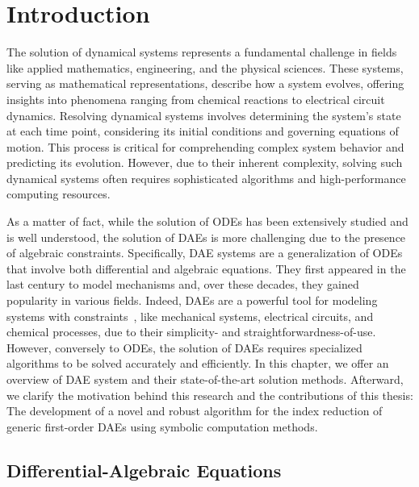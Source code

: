 
\chapter{Introduction}
\label{chap1:introduction}

The solution of dynamical systems represents a fundamental challenge in fields like applied mathematics, engineering, and the physical sciences. These systems, serving as mathematical representations, describe how a system evolves, offering insights into phenomena ranging from chemical reactions to electrical circuit dynamics. Resolving dynamical systems involves determining the system's state at each time point, considering its initial conditions and governing equations of motion. This process is critical for comprehending complex system behavior and predicting its evolution. However, due to their inherent complexity, solving such dynamical systems often requires sophisticated algorithms and high-performance computing resources.

As a matter of fact, while the solution of \acp{ODE} has been extensively studied and is well understood, the solution of \acp{DAE} is more challenging due to the presence of algebraic constraints. Specifically, \ac{DAE} systems are a generalization of \acp{ODE} that involve both differential and algebraic equations. They first appeared in the last century to model mechanisms and, over these decades, they gained popularity in various fields. Indeed, \acp{DAE} are a powerful tool for modeling systems with constraints~\cite{burger2018dae}, like mechanical systems, electrical circuits, and chemical processes, due to their simplicity- and straightforwardness-of-use. However, conversely to \acp{ODE}, the solution of \acp{DAE} requires specialized algorithms to be solved accurately and efficiently. In this chapter, we offer an overview of \ac{DAE} system and their state-of-the-art solution methods. Afterward, we clarify the motivation behind this research and the contributions of this thesis: The development of a novel and robust algorithm for the index reduction of generic first-order \acp{DAE} using symbolic computation methods.


\section{Differential-Algebraic Equations}

